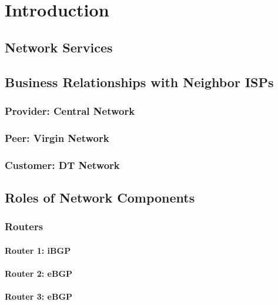 \chapter{Introduction}
\label{chap:introduction}

\section{Network Services}



\section{Business Relationships with Neighbor ISPs}

\subsection{Provider: Central Network}

\subsection{Peer: Virgin Network}

\subsection{Customer: DT Network}



\section{Roles of Network Components}

\subsection{Routers}

\subsubsection{Router 1: iBGP}

\subsubsection{Router 2: eBGP}

\subsubsection{Router 3: eBGP}


